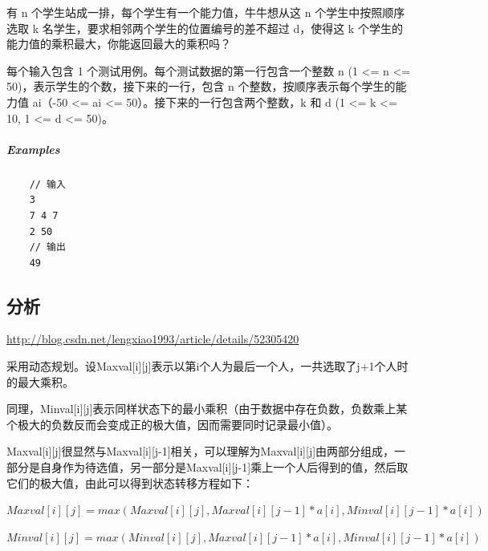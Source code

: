 \documentclass[UTF8,a4paper,12pt]{ctexbook}
\begin{document}
	有 n 个学生站成一排，每个学生有一个能力值，牛牛想从这 n 个学生中按照顺序选取 k 名学生，要求相邻两个学生的位置编号的差不超过 d，使得这 k 个学生的能力值的乘积最大，你能返回最大的乘积吗？
	
	每个输入包含 1 个测试用例。每个测试数据的第一行包含一个整数 n (1 <= n <= 50)，表示学生的个数，接下来的一行，包含 n 个整数，按顺序表示每个学生的能力值 ai（-50 <= ai <= 50）。接下来的一行包含两个整数，k 和 d (1 <= k <= 10, 1 <= d <= 50)。
	
	\subparagraph{Examples}
		\begin{lstlisting}
	// 输入
	3
	7 4 7
	2 50
	// 输出
	49
		\end{lstlisting}
	\subsection{分析}
		\url{http://blog.csdn.net/lengxiao1993/article/details/52305420}
		
		采用动态规划。设Maxval[i][j]表示以第i个人为最后一个人，一共选取了j+1个人时的最大乘积。
		
		同理，Minval[i][j]表示同样状态下的最小乘积（由于数据中存在负数，负数乘上某个极大的负数反而会变成正的极大值，因而需要同时记录最小值）。
		
		Maxval[i][j]很显然与Maxval[i][j-1]相关，可以理解为Maxval[i][j]由两部分组成，一部分是自身作为待选值，另一部分是Maxval[i][j-1]乘上一个人后得到的值，然后取它们的极大值，由此可以得到状态转移方程如下：
		
			$Maxval[i][j] = max(Maxval[i][j], Maxval[i][j-1]*a[i], Minval[i][j-1]*a[i])$
			
			$Minval[i][j] = max(Minval[i][j], Maxval[i][j-1]*a[i], Minval[i][j-1]*a[i])$
			
\end{document}
